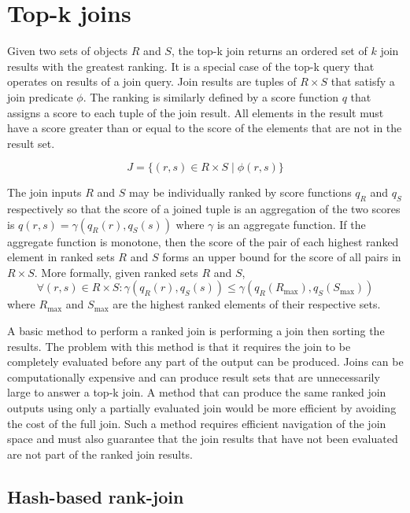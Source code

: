 \section{Top-k joins}

Given two sets of objects \(R\) and \(S\), the top-k join returns an ordered set of \(k\) join results with the greatest ranking. It is a special case of the top-k query that operates on results of a join query. Join results are tuples of \(R \times S\) that satisfy a join predicate \(\phi\). The ranking is similarly defined by a score function \(q\) that assigns a score to each tuple of the join result. All elements in the result must have a score greater than or equal to the score of the elements that are not in the result set.

\[
  J = \{(r, s) \in R \times S \mid \phi(r, s)\}
\]

The join inputs \(R\) and \(S\) may be individually ranked by score functions \(q_R\) and \(q_S\) respectively so that the score of a joined tuple is an aggregation of the two scores is \(q(r, s) = \gamma(q_R(r), q_S(s))\) where \(\gamma\) is an aggregate function. If the aggregate function is monotone, then the score of the pair of each highest ranked element in ranked sets \(R\) and \(S\) forms an upper bound for the score of all pairs in \(R \times S\). More formally, given ranked sets \(R\) and \(S\),
\[
  \forall (r, s) \in R \times S :
  \gamma(q_R(r), q_S(s))
  \leq
  \gamma(q_R(R_{\max}), q_S(S_{\max}))
\]
where \(R_{\max}\) and \(S_{\max}\) are the highest ranked elements of their respective sets.

A basic method to perform a ranked join is performing a join then sorting the results. The problem with this method is that it requires the join to be completely evaluated before any part of the output can be produced. Joins can be computationally expensive and can produce result sets that are unnecessarily large to answer a top-k join. A method that can produce the same ranked join outputs using only a partially evaluated join would be more efficient by avoiding the cost of the full join. Such a method requires efficient navigation of the join space and must also guarantee that the join results that have not been evaluated are not part of the ranked join results.

\subsection{Hash-based rank-join}

